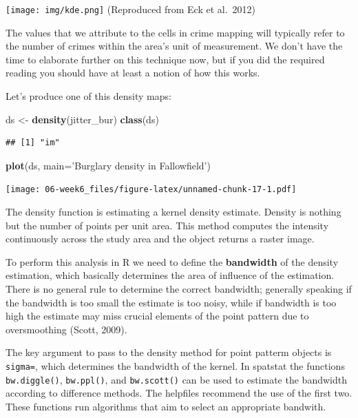 \documentclass[]{book}
\newenvironment{Shaded}{\begin{snugshade}}{\end{snugshade}}
\newcommand{\DataTypeTok}[1]{\textcolor[rgb]{0.13,0.29,0.53}{#1}}
\newcommand{\KeywordTok}[1]{\textcolor[rgb]{0.13,0.29,0.53}{\textbf{#1}}}
\newcommand{\NormalTok}[1]{#1}
\newcommand{\StringTok}[1]{\textcolor[rgb]{0.31,0.60,0.02}{#1}}
\begin{document}
\texttt{[image: img/kde.png]}
(Reproduced from Eck et al.~2012)

The values that we attribute to the cells in crime mapping will typically refer to the number of crimes within the area's unit of measurement. We don't have the time to elaborate further on this technique now, but if you did the required reading you should have at least a notion of how this works.

Let's produce one of this density maps:

\begin{Shaded}
\begin{Highlighting}[]
\NormalTok{ds <-}\StringTok{ }\KeywordTok{density}\NormalTok{(jitter_bur)}
\KeywordTok{class}\NormalTok{(ds)}
\end{Highlighting}
\end{Shaded}

\begin{verbatim}
## [1] "im"
\end{verbatim}

\begin{Shaded}
\begin{Highlighting}[]
\KeywordTok{plot}\NormalTok{(ds, }\DataTypeTok{main=}\StringTok{'Burglary density in Fallowfield'}\NormalTok{)}
\end{Highlighting}
\end{Shaded}

\texttt{[image: 06-week6\_files/figure-latex/unnamed-chunk-17-1.pdf]}

The density function is estimating a kernel density estimate. Density is nothing but the number of points per unit area. This method computes the intensity continuously across the study area and the object returns a raster image.

To perform this analysis in R we need to define the \textbf{bandwidth} of the density estimation, which basically determines the area of influence of the estimation. There is no general rule to determine the correct bandwidth; generally speaking if the bandwidth is too small the estimate is too noisy, while if bandwidth is too high the estimate may miss crucial elements of the point pattern due to oversmoothing (Scott, 2009).

The key argument to pass to the density method for point patterm objects is \texttt{sigma=}, which determines the bandwidth of the kernel. In spatstat the functions \texttt{bw.diggle()}, \texttt{bw.ppl()}, and \texttt{bw.scott()} can be used to estimate the bandwidth according to difference methods. The helpfiles recommend the use of the first two. These functions run algorithms that aim to select an appropriate bandwith.
\end{document}
